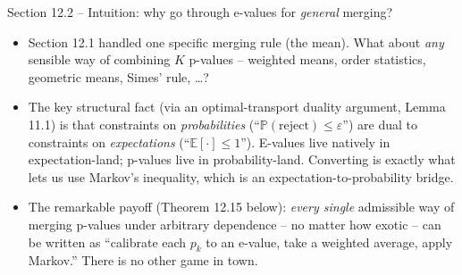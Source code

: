 \documentclass[aspectratio=169,10pt]{beamer}
\newcommand{\PP}{\mathbb{P}}
\newcommand{\EE}{\mathbb{E}}
\begin{document}
\begin{frame}{Section 12.2 -- Intuition: why go through e-values for \emph{general} merging?}
  \begin{itemize}
    \item Section 12.1 handled one specific merging rule (the mean). What about \emph{any} sensible way of combining $K$ p-values -- weighted means, order statistics, geometric means, Simes' rule, \dots?
    \item The key structural fact (via an optimal-transport duality argument, Lemma 11.1) is that constraints on \emph{probabilities} (``$\PP(\text{reject})\le\varepsilon$'') are dual to constraints on \emph{expectations} (``$\EE[\cdot]\le1$''). E-values live natively in expectation-land; p-values live in probability-land. Converting is exactly what lets us use Markov's inequality, which is an expectation-to-probability bridge.
    \item The remarkable payoff (Theorem 12.15 below): \emph{every single} admissible way of merging p-values under arbitrary dependence -- no matter how exotic -- can be written as ``calibrate each $p_k$ to an e-value, take a weighted average, apply Markov.'' There is no other game in town.
  \end{itemize}
\end{frame}
\end{document}
